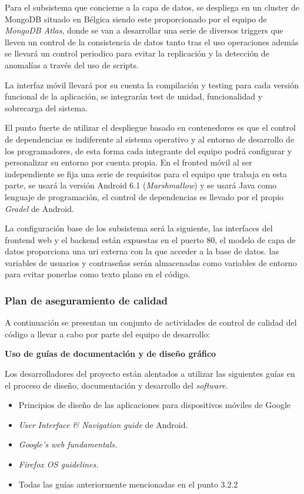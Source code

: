 \documentclass{article}
\begin{document}
Para el subsistema que concierne a la capa de datos, se despliega en un cluster de MongoDB situado en 
Bélgica siendo este proporcionado por el equipo de \textit{MongoDB Atlas}, donde se van a desarrollar una 
serie de diversos triggers que lleven un control de la consistencia de datos tanto tras el uso operaciones 
además se llevará un control periodico para evitar la replicación y la detección de anomalías a través del uso de scripts.

La interfaz móvil llevará por su cuenta la compilación y testing para cada versión funcional de la aplicación, 
se integrarán test de unidad, funcionalidad y sobrecarga del sistema.

El punto fuerte de utilizar el despliegue basado en contenedores es que el control de dependencias es 
indiferente al sistema operativo y al entorno de desarrollo de los programadores, de esta forma cada integrante del 
equipo podrá configurar y personalizar su entorno por cuenta propia. 
En el fronted móvil al ser independiente se fija una serie de requisitos para el equipo que trabaja en esta parte, 
se usará la versión Android 6.1 (\textit{Marshmallow}) y se usará Java como lenguaje de programación, el control de 
dependencias es llevado por el propio \textit{Gradel} de Android.

La configuración base de los subsistema será la siguiente, las interfaces del frontend web y el backend están 
expuestas en el puerto 80, el modelo de capa de datos proporciona una uri externa con la que acceder a la base de 
datos. las variables de usuarios y contraseñas serán almacenadas como variables de entorno para evitar ponerlas como 
texto plano en el código.

\subsubsection{Plan de aseguramiento de calidad}

A continuación se presentan un conjunto de actividades de control de calidad del código a llevar a cabo por parte 
del equipo de desarrollo:

\textbf{Uso de guías de documentación y de diseño gráfico}

Los desarrolladores del proyecto están alentados a utilizar las siguientes guías en el proceso de diseño, 
documentación y desarrollo del \textit{software}.

\begin{itemize}
    \setlength{\itemsep}{0em} %
    \item Principios de diseño de las aplicaciones para dispositivos móviles de Google
    \item \textit{User Interface \& Navigation guide} de Android.
    \item \textit{Google's web fundamentals.}
    \item \textit{Firefox OS guidelines.}
    \item Todas las guías anteriormente mencionadas en el punto 3.2.2
\end{itemize}
\end{document}

